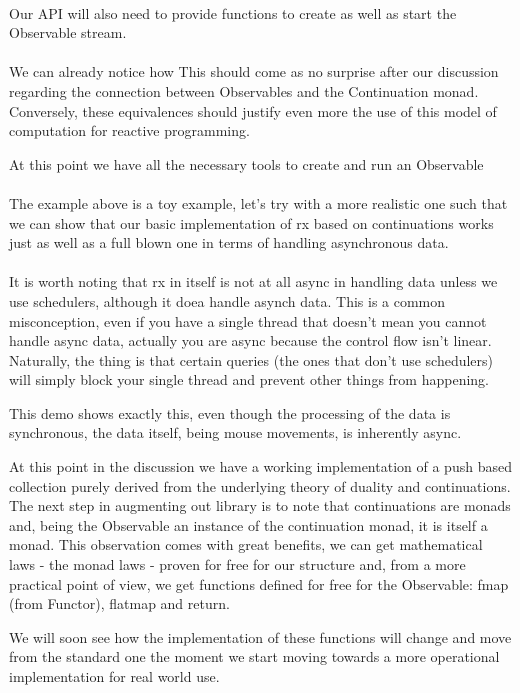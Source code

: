 \\

Our API will also need to provide functions to create as well as start the Observable stream.\\

\\

We can already notice how This should come as no surprise after our discussion regarding the connection between Observables and the Continuation monad. Conversely, these equivalences should justify even more the use of this model of computation for reactive programming.

At this point we have all the necessary tools to create and run an Observable\\

\\

The example above is a toy example, let's try with a more realistic one such that we can show that our basic implementation of rx based on continuations works just as well as a full blown one in terms of handling asynchronous data.\\ 

\\

It is worth noting that rx in itself is not at all async in handling data unless we use schedulers, although it doea handle asynch data. This is a common misconception, even if you have a single thread that doesn't mean you cannot handle async data, actually you are async because the control flow isn't linear. Naturally, the thing is that certain queries (the ones that don't use schedulers) will simply block your single thread and prevent other things from happening.

This demo shows exactly this, even though the processing of the data is synchronous, the data itself, being mouse movements, is inherently async.

At this point in the discussion we have a working implementation of a push based collection purely derived from the underlying theory of duality and continuations. The next step in augmenting out library is to note that continuations are monads and, being the Observable an instance of the continuation monad, it is itself a monad. This observation comes with great benefits, we can get mathematical laws - the monad laws - proven for free for our structure and, from a more practical point of view, we get functions defined for free for the Observable: fmap (from Functor), flatmap and return.


We will soon see how the implementation of these functions will change and move from the standard one the moment we start moving towards a more operational implementation for real world use.